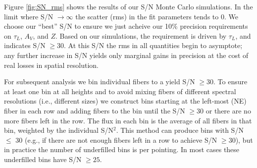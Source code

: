 Figure \ref{fig:SN_rms} shows the results of our S/N Monte Carlo
simulations. In the limit where S/N $\rightarrow\infty$ the scatter
(rms) in the fit parameters tends to 0.  We choose our ``best'' S/N to
ensure we just acheive our 10\% precision requirements on $\tau_L$,
$A_V$, and $Z$.  Based on our simulations, the requirement is driven
by $\tau_L$, and indicates S/N $\geq 30$.  At this S/N the rms in all
quantities begin to asymptote; any further increase in S/N yields only
marginal gains in precision at the cost of real losses in spatial
resolution.

For subsequent analysis we bin individual \GP fibers to a yield S/N
$\geq 30$. To ensure at least one bin at all heights and to avoid
mixing fibers of different spectral resolutions (i.e., different
sizes) we construct bins starting at the left-most (NE) fiber in each
row and adding fibers to the bin until the S/N $\geq 30$ or there are
no more fibers left in the row. The flux in each bin is the average of
all fibers in that bin, weighted by the individual S/N$^2$. This
method can produce bins with S/N $\leq$ 30 (e.g., if there are not
enough fibers left in a row to achieve S/N $\geq 30$), but in practice
the number of underfilled bins is  per pointing. In most cases
these underfilled bins have S/N $\geq 25$.






